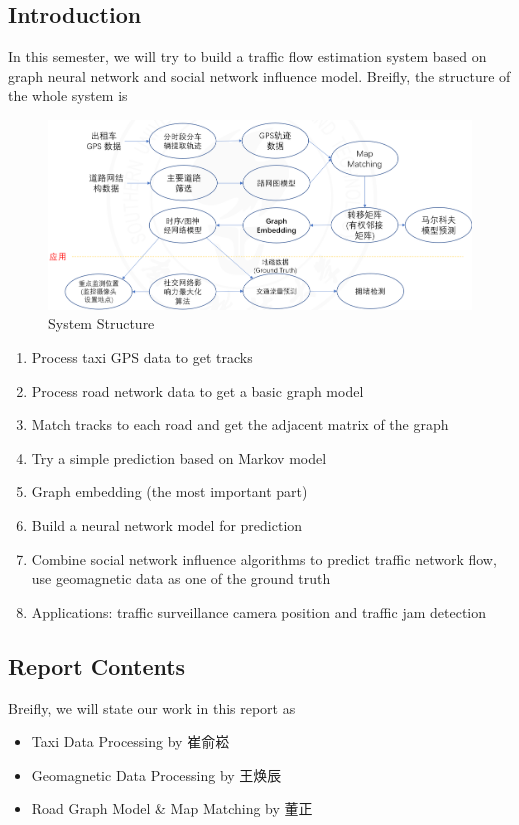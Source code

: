 \documentclass[fontset=none]{ctexart}
\theoremstyle{definition}
\theoremstyle{remark}
\begin{document}
\subsection{Introduction}
In this semester, we will try to build a traffic flow estimation system based on graph neural network and
social network influence model. Breifly, the structure of the whole system is

\begin{figure}[htb]
  \centering
  \includegraphics[width=\textwidth]{images/7-1-1.png}
  \caption{System Structure}
  \label{fig: structure}
\end{figure}

\begin{enumerate}
  \item Process taxi GPS data to get tracks
  \item Process road network data to get a basic graph model
  \item Match tracks to each road and get the adjacent matrix of the graph
  \item Try a simple prediction based on Markov model
  \item Graph embedding (the most important part)
  \item Build a neural network model for prediction
  \item Combine social network influence algorithms to predict traffic network flow, use geomagnetic data as one of the ground truth
  \item Applications: traffic surveillance camera position and traffic jam detection
\end{enumerate}

\subsection{Report Contents}
Breifly, we will state our work in this report as
\begin{itemize}
  \item Taxi Data Processing by 崔俞崧
  \item Geomagnetic Data Processing by 王焕辰
  \item Road Graph Model \& Map Matching by 董正
\end{itemize}
\end{document}
